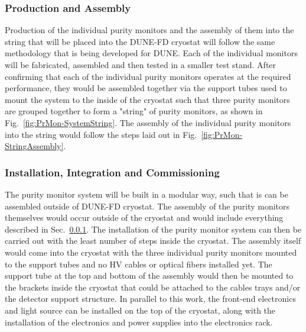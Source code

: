 \subsubsection{Production and Assembly}
\label{sec:PrMon-Production-Assembly}
Production of the individual purity monitors and the assembly of them into the string that will be placed into the DUNE-FD cryostat will follow the same methodology that is being developed for DUNE.  Each of the individual monitors will be fabricated, assembled and then tested in a smaller test stand.  After confirming that each of the individual purity monitors operates at the required performance, they would be assembled together via the support tubes used to mount the system to the inside of the cryostat such that three purity monitors are grouped together to form a "string" of purity monitors, as shown in Fig.~\ref{fig:PrMon-SystemString}.  The assembly of the individual purity monitors into the string would follow the steps laid out in Fig.~\ref{fig:PrMon-StringAssembly}.  








\subsubsection{Installation, Integration and Commissioning}
\label{sec:PrMon-Install-Integrate-Commission}
The purity monitor system will be built in a modular way, such that is can be assembled outside of DUNE-FD cryostat.  The assembly of the purity monitors themselves would occur outside of the cryostat and would include everything described in Sec.~\ref{sec:PrMon-Production-Assembly}.  The installation of the purity monitor system can then be carried out with the least number of steps inside the cryostat.  The assembly itself would come into the cryostat with the three individual purity monitors mounted to the support tubes and no HV cables or optical fibers installed yet.  The support tube at the top and bottom of the assembly would then be mounted to the brackets inside the cryostat that could be attached to the cables trays and/or the detector support structure.  In parallel to this work, the front-end electronics and light source can be installed on the top of the cryostat, along with the installation of the electronics and power supplies into the electronics rack.  

